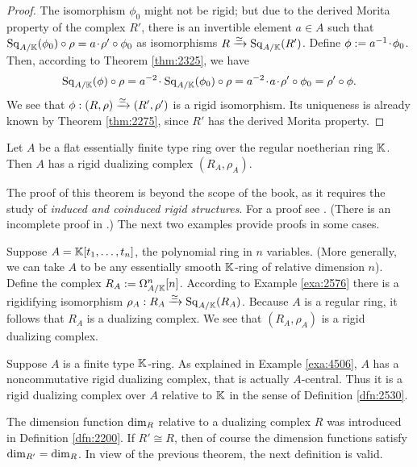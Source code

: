\begin{proof}
The isomorphism $\phi_0$ might not be rigid; but due to the derived 
Morita property of the complex $R'$, there is an invertible element $a \in A$ 
such that 
$\operatorname{Sq}_{A / \mathbb{K}}(\phi_0) \circ \rho = a \mspace{1.5mu}{\cdot}\mspace{1.5mu} \rho' \circ \phi_0$ 
as isomorphisms 
$R \xrightarrow{\simeq} \operatorname{Sq}_{A / \mathbb{K}}(R')$. 
Define $\phi := a^{-1} \mspace{1.5mu}{\cdot}\mspace{1.5mu} \phi_0$. 
Then, according to Theorem \ref{thm:2325}, we have 
\[ \operatorname{Sq}_{A / \mathbb{K}}(\phi) \circ \rho = 
a^{-2} \mspace{1.5mu}{\cdot}\mspace{1.5mu} \operatorname{Sq}_{A / \mathbb{K}}(\phi_0) \circ \rho = 
a^{-2} \mspace{1.5mu}{\cdot}\mspace{1.5mu} a \mspace{1.5mu}{\cdot}\mspace{1.5mu} \rho' \circ \phi_0 = \rho' \circ \phi . \]
We see that
$\phi : (R, \rho) \xrightarrow{\simeq} (R', \rho')$
is a rigid isomorphism. Its uniqueness is already known by Theorem 
\ref{thm:2275}, since $R'$ has the derived Morita property.
\end{proof}

\begin{thm}[Existence] \label{thm:3210}
Let $A$ be a flat essentially finite type ring over the regular noetherian ring 
$\mathbb{K}$. Then $A$ has a rigid dualizing complex $(R_A, \rho_A)$. 
\end{thm}

The proof of this theorem is beyond the scope of the book, as it requires 
the study of {\em induced and coinduced rigid structures}. 
For a proof see \cite{Ye11}. (There is an incomplete proof in 
\cite[Theorem 1.1]{YeZh4}.)
The next two examples provide proofs in some cases. 

\begin{exa} \label{exa:4200}
Suppose $A = \mathbb{K}[t_1, \ldots, t_n]$, the polynomial ring in $n$ variables.
(More generally, we can take $A$ to be any essentially smooth $\mathbb{K}$-ring of 
relative dimension $n$). Define the complex 
$R_A := \Omega^n_{A / \mathbb{K}}[n]$. According to Example \ref{exa:2576} there is a 
rigidifying isomorphism 
$\rho_A : R_A \xrightarrow{\simeq} \operatorname{Sq}_{A / \mathbb{K}}(R_A)$.
Because $A$ is a regular ring, it follows that $R_A$ is a dualizing complex. We 
see that $(R_A, \rho_A)$ is a rigid dualizing complex. 
\end{exa}

\begin{exa} \label{exa:4201}
Suppose $A$ is a finite type $\mathbb{K}$-ring. As explained in Example \ref{exa:4506},
$A$ has a noncommutative rigid dualizing complex, that is actually $A$-central. 
Thus it is a rigid dualizing complex over $A$ relative to $\mathbb{K}$ in the sense of 
Definition \ref{dfn:2530}. 
\end{exa}

The dimension function $\operatorname{dim}_R$ relative to a dualizing complex $R$
was introduced in Definition \ref{dfn:2200}. If $R' \cong R$, then of course 
the dimension functions satisfy 
$\operatorname{dim}_{R'} = \operatorname{dim}_R$. 
In view of the previous theorem, the next definition is valid. 

